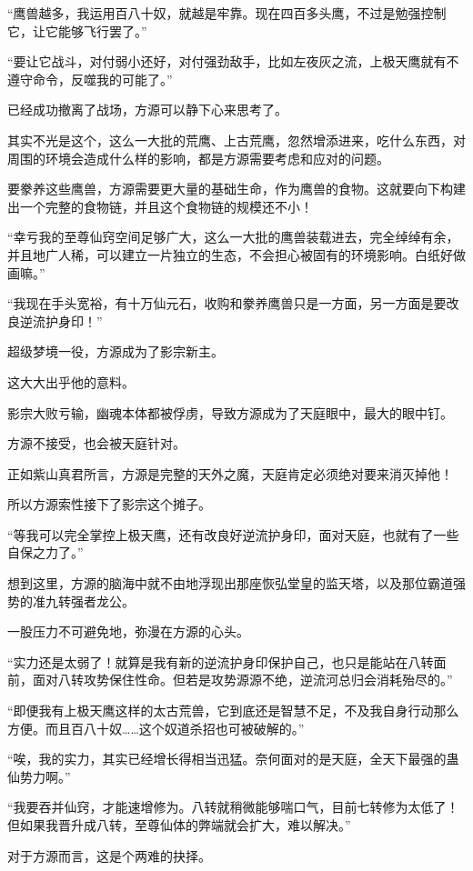 \begin{this_body}
“鹰兽越多，我运用百八十奴，就越是牢靠。现在四百多头鹰，不过是勉强控制它，让它能够飞行罢了。”

“要让它战斗，对付弱小还好，对付强劲敌手，比如左夜灰之流，上极天鹰就有不遵守命令，反噬我的可能了。”

已经成功撤离了战场，方源可以静下心来思考了。

其实不光是这个，这么一大批的荒鹰、上古荒鹰，忽然增添进来，吃什么东西，对周围的环境会造成什么样的影响，都是方源需要考虑和应对的问题。

要豢养这些鹰兽，方源需要更大量的基础生命，作为鹰兽的食物。这就要向下构建出一个完整的食物链，并且这个食物链的规模还不小！

“幸亏我的至尊仙窍空间足够广大，这么一大批的鹰兽装载进去，完全绰绰有余，并且地广人稀，可以建立一片独立的生态，不会担心被固有的环境影响。白纸好做画嘛。”

“我现在手头宽裕，有十万仙元石，收购和豢养鹰兽只是一方面，另一方面是要改良逆流护身印！”

超级梦境一役，方源成为了影宗新主。

这大大出乎他的意料。

影宗大败亏输，幽魂本体都被俘虏，导致方源成为了天庭眼中，最大的眼中钉。

方源不接受，也会被天庭针对。

正如紫山真君所言，方源是完整的天外之魔，天庭肯定必须绝对要来消灭掉他！

所以方源索性接下了影宗这个摊子。

“等我可以完全掌控上极天鹰，还有改良好逆流护身印，面对天庭，也就有了一些自保之力了。”

想到这里，方源的脑海中就不由地浮现出那座恢弘堂皇的监天塔，以及那位霸道强势的准九转强者龙公。

一股压力不可避免地，弥漫在方源的心头。

“实力还是太弱了！就算是我有新的逆流护身印保护自己，也只是能站在八转面前，面对八转攻势保住性命。但若是攻势源源不绝，逆流河总归会消耗殆尽的。”

“即便我有上极天鹰这样的太古荒兽，它到底还是智慧不足，不及我自身行动那么方便。而且百八十奴……这个奴道杀招也可被破解的。”

“唉，我的实力，其实已经增长得相当迅猛。奈何面对的是天庭，全天下最强的蛊仙势力啊。”

“我要吞并仙窍，才能速增修为。八转就稍微能够喘口气，目前七转修为太低了！但如果我晋升成八转，至尊仙体的弊端就会扩大，难以解决。”

对于方源而言，这是个两难的抉择。


\end{this_body}
